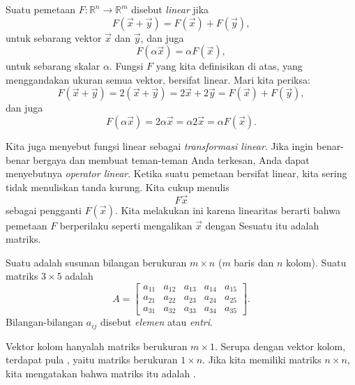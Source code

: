 Suatu pemetaan $F \colon {\mathbb R}^n \to {\mathbb R}^m$
disebut \emph{linear} jika
\begin{equation*}
F(\vec{x}+\vec{y}) = F(\vec{x})+F(\vec{y}),
\end{equation*}
untuk sebarang vektor $\vec{x}$ dan $\vec{y}$,
dan juga
\begin{equation*}
F(\alpha \vec{x}) = \alpha F(\vec{x}) ,
\end{equation*}
untuk sebarang skalar $\alpha$.
Fungsi $F$ yang kita definisikan di atas, yang menggandakan ukuran semua vektor, bersifat linear. Mari
kita periksa:
\begin{equation*}
F(\vec{x}+\vec{y})
=
2(\vec{x}+\vec{y})
=
2\vec{x}+2\vec{y}
=
F(\vec{x})+F(\vec{y}) ,
\end{equation*}
dan juga
\begin{equation*}
F(\alpha \vec{x}) = 2 \alpha \vec{x} = \alpha 2 \vec{x} = \alpha F(\vec{x}) .
\end{equation*}

Kita juga menyebut fungsi linear sebagai
\emph{transformasi linear}.
Jika ingin benar-benar bergaya dan membuat teman-teman Anda terkesan, Anda dapat menyebutnya
\emph{operator linear}.
Ketika suatu pemetaan bersifat linear, kita sering tidak menuliskan tanda kurung. Kita cukup menulis
\begin{equation*}
F \vec{x}
\end{equation*}
sebagai pengganti $F(\vec{x})$. Kita melakukan ini karena linearitas berarti bahwa
pemetaan $F$
berperilaku seperti mengalikan $\vec{x}$ dengan 
Sesuatu itu adalah matriks.

Suatu \emph{}
adalah susunan bilangan berukuran $m
\times n$ ($m$ baris dan $n$ kolom). Suatu matriks
$3 \times 5$ adalah
\begin{equation*}
A =
\begin{bmatrix}
a_{11} & a_{12} & a_{13} & a_{14} & a_{15} \\
a_{21} & a_{22} & a_{23} & a_{24} & a_{25} \\
a_{31} & a_{32} & a_{33} & a_{34} & a_{35}
\end{bmatrix} .
\end{equation*}
Bilangan-bilangan $a_{ij}$ disebut \emph{elemen}
atau \emph{entri}.

Vektor kolom hanyalah matriks berukuran $m \times 1$. Serupa dengan
vektor kolom, terdapat pula
\emph{}, yaitu matriks berukuran $1 \times n$.
Jika kita memiliki matriks $n \times n$, kita mengatakan bahwa matriks itu adalah
\emph{}.


